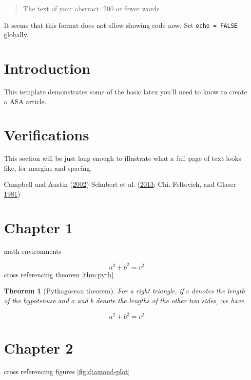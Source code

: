 \documentclass[journal=,manuscript=]{achemso}
\title[]{}
\newtheorem{theorem}{Theorem}[section]
\theoremstyle{definition}
\theoremstyle{definition}
\theoremstyle{definition}
\theoremstyle{remark}
\begin{document}
\begin{abstract}
The text of your abstract. 200 or fewer words.
\end{abstract}
It seems that this format does not allow showing code now. Set \texttt{echo\ =\ FALSE} globally.

\hypertarget{introduction}{%
\section{Introduction}\label{introduction}}

This template demonstrates some of the basic latex you'll need to know to create a ASA article.

\section{Verifications}
\label{sec:verify}

This section will be just long enough to illustrate what a full page of
text looks like, for margins and spacing.

Campbell and Austin (\protect\hyperlink{ref-Campbell02}{2002}) Schubert et al. (\protect\hyperlink{ref-Schubert13}{2013}; Chi, Feltovich, and Glaser \protect\hyperlink{ref-Chi81}{1981})

\hypertarget{chapter-1}{%
\section{Chapter 1}\label{chapter-1}}

math environments

\[
a^2 + b^2 = c^2 
\]
cross referencing theorem \ref{thm:pyth}

\begin{theorem}[Pythagorean theorem]
\protect\hypertarget{thm:pyth}{}{\label{thm:pyth} {} }For a right triangle, if \(c\) denotes the length of the hypotenuse
and \(a\) and \(b\) denote the lengths of the other two sides, we have

\[a^2 + b^2 = c^2\]
\end{theorem}

\hypertarget{chapter-2}{%
\section{Chapter 2}\label{chapter-2}}

cross referencing figures \ref{fig:diamond-plot}
\end{document}
